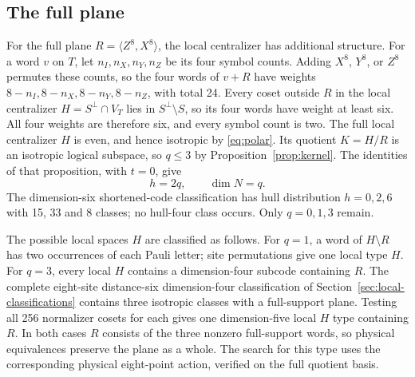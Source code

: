 \subsection{The full plane}

For the full plane \(R=\langle Z^8,X^8\rangle\), the local
centralizer has additional structure. For a word \(v\) on \(T\), let
\(n_I,n_X,n_Y,n_Z\) be its four symbol counts. Adding \(X^8\),
\(Y^8\), or \(Z^8\) permutes these counts, so the four words of
\(v+R\) have weights \(8-n_I,8-n_X,8-n_Y,8-n_Z\), with total 24.
Every coset outside \(R\) in the local centralizer
\(H=S^\perp\cap V_T\) lies in \(S^\perp\setminus S\), so its four
words have weight at least six. All four weights are therefore six, and
every symbol count is two. The full local centralizer \(H\) is even, and
hence isotropic by \eqref{eq:polar}.
Its quotient \(K=H/R\) is an isotropic logical subspace, so \(q\leq3\)
by Proposition~\ref{prop:kernel}. The identities of that proposition,
with \(t=0\), give
\[
 h=2q,\qquad \dim N=q.
\]
The dimension-six shortened-code classification has hull distribution
\(h=0,2,6\) with 15, 33 and 8 classes; no hull-four class occurs.
Only \(q=0,1,3\) remain.

The possible local spaces \(H\) are classified as follows.
For \(q=1\), a word of \(H\setminus R\) has two occurrences of
each Pauli letter; site permutations give one local type \(H\).
For \(q=3\), every local \(H\) contains a dimension-four subcode
containing \(R\). The complete eight-site distance-six dimension-four
classification of Section~\ref{sec:local-classifications} contains three
isotropic classes with a full-support plane.
Testing all 256 normalizer cosets for each gives one dimension-five
local \(H\) type containing \(R\). In both cases \(R\) consists of
the three nonzero full-support words, so physical equivalences preserve
the plane as a whole. The search for this type uses the corresponding
physical eight-point action, verified on the full quotient basis.

